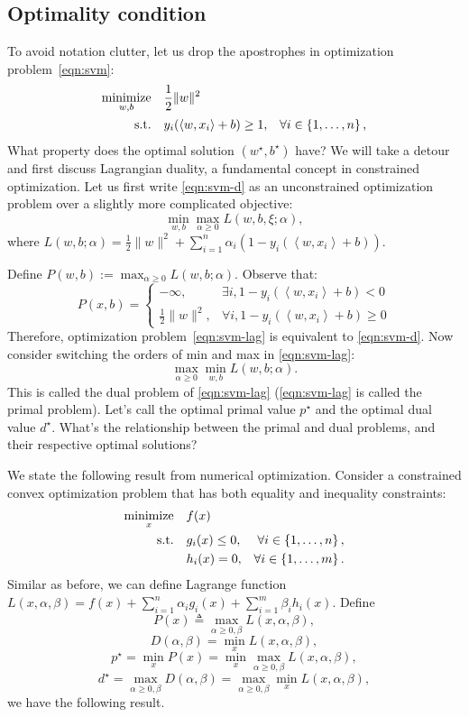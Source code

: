 \documentclass{article}
\DeclareMathOperator*{\minimize}{{\rm minimize}}
\DeclareMathOperator*{\st}{{\rm s.t.}}
\newcommand{\defeq}{\triangleq}
\newcommand{\inner}[2]{\left\langle #1,#2 \right\rangle}
\begin{document}
\subsection{Optimality condition}
To avoid notation clutter, let us drop the apostrophes in optimization problem~\eqref{eqn:svm}:
\begin{align}
  \minimize_{w,b} \quad & \frac12 \| w \|^2 & \label{eqn:svm-d} \\
    \st \quad &  y_i(\inner{w}{x_i} + b) \geq 1, &\forall i \in \cbr{1,\ldots,n}, \nonumber
\end{align}
What property does the optimal solution $(w^\star, b^\star)$ have? We will take a detour and first discuss Lagrangian duality, a fundamental concept in constrained optimization. Let us first write \eqref{eqn:svm-d} as an unconstrained optimization problem over a slightly more complicated objective:
\begin{equation}
   \min_{w,b} \max_{\alpha \geq 0} L(w,b,\xi;\alpha),
   \label{eqn:svm-lag}
\end{equation}
where $L(w,b;\alpha) = \frac 1 2 \| w \|^2 + \sum_{i=1}^n \alpha_i (1 - y_i(\inner{w}{x_i} + b))$.

Define $P(w,b) := \max_{\alpha \geq 0} L(w,b;\alpha)$. Observe that:
\[
P(x,b) =
\begin{cases}
-\infty, & \exists i, 1 - y_i(\inner{w}{x_i} + b) < 0 \\
\frac 1 2 \| w \|^2, & \forall i, 1 - y_i(\inner{w}{x_i} + b) \geq 0
\end{cases}
\]
Therefore, optimization problem~\eqref{eqn:svm-lag} is equivalent to \eqref{eqn:svm-d}. Now consider switching the orders of min and max in \eqref{eqn:svm-lag}:
\[ \max_{\alpha \geq 0} \min_{w,b} L(w,b;\alpha). \]
This is called the dual problem of \eqref{eqn:svm-lag} (\eqref{eqn:svm-lag} is called the primal problem). Let's call the optimal primal value $p^\star$ and the optimal dual value $d^\star$. What's the relationship between the primal and dual problems, and their respective optimal solutions?

We state the following result from numerical optimization. Consider a constrained convex optimization problem that has both equality and inequality constraints:
\begin{align}
  \minimize_{x} \quad & f(x) & \nonumber \\
    \st \quad & g_i(x) \leq 0, &\forall i \in \cbr{1,\ldots,n}, \nonumber \\
              & h_i(x) = 0, &\forall i \in \cbr{1,\ldots,m}. \nonumber
\end{align}
Similar as before, we can define Lagrange function $L(x,\alpha,\beta) = f(x) + \sum_{i=1}^n \alpha_i g_i(x) + \sum_{i=1}^m \beta_i h_i(x)$. Define
\[ P(x) \defeq \max_{\alpha \geq 0, \beta} L(x,\alpha,\beta), \]
\[ D(\alpha, \beta) = \min_x L(x,\alpha,\beta), \]
\[ p^\star = \min_x P(x) = \min_x \max_{\alpha \geq 0, \beta} L(x,\alpha,\beta),\]
\[ d^\star = \max_{\alpha \geq 0, \beta} D(\alpha, \beta) = \max_{\alpha \geq 0, \beta} \min_x L(x,\alpha,\beta),\]
we have the following result.
\end{document}
